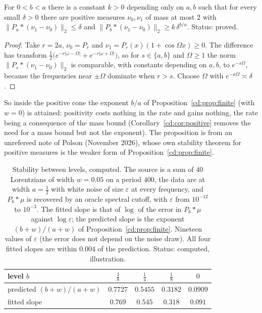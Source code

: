 \begin{proposition}\label{cd:prop:conelower}
For $0<b<a$ there is a constant $k>0$ depending only on $a,b$ such that for every small $\delta>0$ there are positive measures $\nu_0,\nu_1$ of mass at most $2$ with $\|P_a*(\nu_1-\nu_0)\|_2\le\delta$ and $\|P_b*(\nu_1-\nu_0)\|_2\ge k\,\delta^{b/a}$. Status: proved.
\end{proposition}

\begin{proof}
Take $r=2a$, $\nu_0=P_r$ and $\nu_1=P_r(x)(1+\cos\Omega x)\ge0$. The difference has transform $\tfrac12\bigl(e^{-r|\omega-\Omega|}+e^{-r|\omega+\Omega|}\bigr)$, so for $s\in\{a,b\}$ and $\Omega\ge1$ the norm $\|P_s*(\nu_1-\nu_0)\|_2$ is comparable, with constants depending on $a,b$, to $e^{-s\Omega}$, because the frequencies near $\pm\Omega$ dominate when $r>s$. Choose $\Omega$ with $e^{-a\Omega}\asymp\delta$.
\end{proof}

So inside the positive cone the exponent $b/a$ of Proposition~\ref{cd:prop:finite} (with $w=0$) is attained: positivity costs nothing in the rate and gains nothing, the rate being a consequence of the mass bound (Corollary~\ref{cd:cor:positive} removes the need for a mass bound but not the exponent). The proposition is from an unrefereed note of Polson (November 2026), whose own stability theorem for positive measures is the weaker form of Proposition~\ref{cd:prop:finite}.

\begin{table}[ht]
\centering
\caption{Stability between levels, computed. The source is a sum of $40$ Lorentzians of width $w=0.05$ on a period $400$, the data are at width $a=\tfrac12$ with white noise of size $\varepsilon$ at every frequency, and $P_b*\mu$ is recovered by an oracle spectral cutoff, with $\varepsilon$ from $10^{-12}$ to $10^{-3}$. The fitted slope is that of $\log$ of the error in $P_b*\mu$ against $\log\varepsilon$; the predicted slope is the exponent $(b+w)/(a+w)$ of Proposition~\ref{cd:prop:finite}. Nineteen values of $\varepsilon$ (the error does not depend on the noise draw). All four fitted slopes are within $0.004$ of the prediction. Status: computed, illustration.}\label{cd:tab:slopes}
\begin{tabular}{lcccc}
\toprule
level $b$ & $\tfrac38$ & $\tfrac14$ & $\tfrac18$ & $0$ \\
\midrule
predicted $(b+w)/(a+w)$ & $0.7727$ & $0.5455$ & $0.3182$ & $0.0909$ \\
fitted slope & $0.769$ & $0.545$ & $0.318$ & $0.091$ \\
\bottomrule
\end{tabular}
\end{table}

